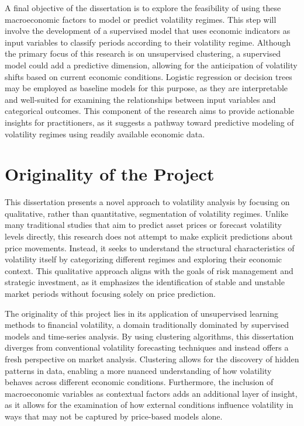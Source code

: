 A final objective of the dissertation is to explore the feasibility of using these macroeconomic factors to model or predict volatility regimes. This step will involve the development of a supervised model that uses economic indicators as input variables to classify periods according to their volatility regime. Although the primary focus of this research is on unsupervised clustering, a supervised model could add a predictive dimension, allowing for the anticipation of volatility shifts based on current economic conditions. Logistic regression or decision trees may be employed as baseline models for this purpose, as they are interpretable and well-suited for examining the relationships between input variables and categorical outcomes. This component of the research aims to provide actionable insights for practitioners, as it suggests a pathway toward predictive modeling of volatility regimes using readily available economic data.


\section{Originality of the Project}

This dissertation presents a novel approach to volatility analysis by focusing on qualitative, rather than quantitative, segmentation of volatility regimes. Unlike many traditional studies that aim to predict asset prices or forecast volatility levels directly, this research does not attempt to make explicit predictions about price movements. Instead, it seeks to understand the structural characteristics of volatility itself by categorizing different regimes and exploring their economic context. This qualitative approach aligns with the goals of risk management and strategic investment, as it emphasizes the identification of stable and unstable market periods without focusing solely on price prediction.

The originality of this project lies in its application of unsupervised learning methods to financial volatility, a domain traditionally dominated by supervised models and time-series analysis. By using clustering algorithms, this dissertation diverges from conventional volatility forecasting techniques and instead offers a fresh perspective on market analysis. Clustering allows for the discovery of hidden patterns in data, enabling a more nuanced understanding of how volatility behaves across different economic conditions. Furthermore, the inclusion of macroeconomic variables as contextual factors adds an additional layer of insight, as it allows for the examination of how external conditions influence volatility in ways that may not be captured by price-based models alone.

